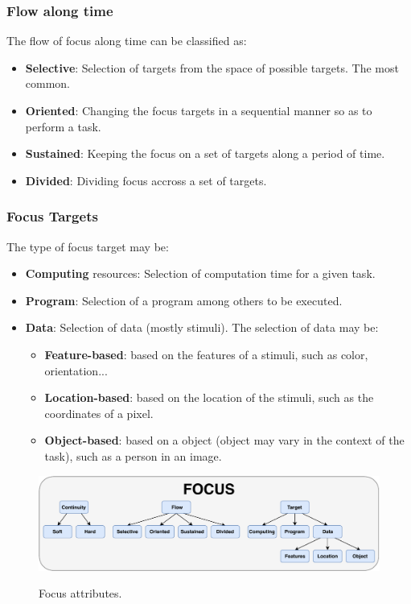 \documentclass[11pt]{article}
\begin{document}
\subsubsection{Flow along time}
The flow of focus along time can be classified as:
\begin{itemize}
    \item \textbf{Selective}: Selection of targets from the space of possible targets. The most common.
    \item \textbf{Oriented}: Changing the focus targets in a sequential manner so as to perform a task.
    \item \textbf{Sustained}: Keeping the focus on a set of targets along a period of time.
    \item \textbf{Divided}: Dividing focus accross a set of targets.
\end{itemize}

\subsubsection{Focus Targets}
The type of focus target may be:
\begin{itemize}
    \item \textbf{Computing} resources: Selection of computation time for a given task.
    \item \textbf{Program}: Selection of a program among others to be executed.
    \item \textbf{Data}: Selection of data (mostly stimuli). The selection of data may be:
    \begin{itemize}
        \item \textbf{Feature-based}: based on the features of a stimuli, such as color, orientation...
        \item \textbf{Location-based}: based on the location of the stimuli, such as the coordinates of a pixel.
        \item \textbf{Object-based}: based on a object (object may vary in the context of the task), such as a person in an image.
    \end{itemize}
\end{itemize}

\begin{figure}[H]
    \centering
    \includegraphics[width=1.0\linewidth]{./img/taxonomy.pdf}\label{fig:taxonomy}
    \caption{Focus attributes.}
\end{figure}
\end{document}
